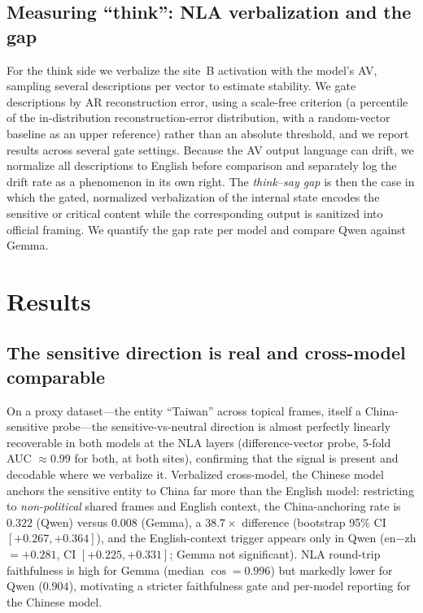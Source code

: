 \documentclass[11pt]{article}
\begin{document}
\subsection{Measuring ``think'': NLA verbalization and the gap}
For the think side we verbalize the site~B activation with the model's AV,
sampling several descriptions per vector to estimate stability. We gate
descriptions by AR reconstruction error, using a scale-free criterion (a
percentile of the in-distribution reconstruction-error distribution, with a
random-vector baseline as an upper reference) rather than an absolute
threshold, and we report results across several gate settings. Because the AV
output language can drift, we normalize all descriptions to English before
comparison and separately log the drift rate as a phenomenon in its own right.
The \emph{think--say gap} is then the case in which the gated, normalized
verbalization of the internal state encodes the sensitive or critical content
while the corresponding output is sanitized into official framing. We quantify
the gap rate per model and compare Qwen against Gemma.

\section{Results}

\subsection{The sensitive direction is real and cross-model comparable}
On a proxy dataset---the entity ``Taiwan'' across topical frames, itself a
China-sensitive probe---the sensitive-vs-neutral direction is almost perfectly
linearly recoverable in both models at the NLA layers (difference-vector
probe, 5-fold AUC $\approx 0.99$ for both, at both sites), confirming that the
signal is present and decodable where we verbalize it. Verbalized cross-model,
the Chinese model anchors the sensitive entity to China far more than the
English model: restricting to \emph{non-political} shared frames and English
context, the China-anchoring rate is $0.322$ (Qwen) versus $0.008$ (Gemma), a
$38.7\times$ difference (bootstrap 95\% CI $[+0.267, +0.364]$), and the
English-context trigger appears only in Qwen (en$-$zh $=+0.281$, CI
$[+0.225,+0.331]$; Gemma not significant). NLA round-trip faithfulness is high
for Gemma (median $\cos = 0.996$) but markedly lower for Qwen ($0.904$),
motivating a stricter faithfulness gate and per-model reporting for the
Chinese model.
\end{document}
